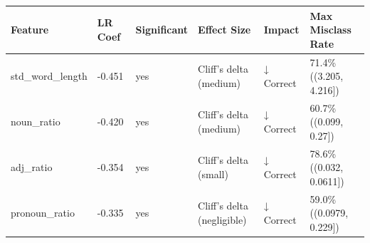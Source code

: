 \begin{tabular}{llllll}
\toprule
Feature & LR Coef & Significant & Effect Size & Impact & Max Misclass Rate \\
\midrule
std\_word\_length & -0.451 & yes & Cliff's delta (medium) & ↓ Correct & 71.4\% ((3.205, 4.216]) \\
noun\_ratio & -0.420 & yes & Cliff's delta (medium) & ↓ Correct & 60.7\% ((0.099, 0.27]) \\
adj\_ratio & -0.354 & yes & Cliff's delta (small) & ↓ Correct & 78.6\% ((0.032, 0.0611]) \\
pronoun\_ratio & -0.335 & yes & Cliff's delta (negligible) & ↓ Correct & 59.0\% ((0.0979, 0.229]) \\
\bottomrule
\end{tabular}
